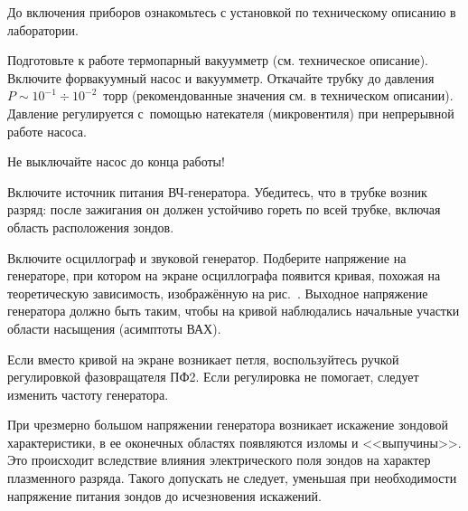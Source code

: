 \begin{lab:task}



\item До включения приборов ознакомьтесь с установкой по техническому описанию 
в лаборатории.

\item Подготовьте к работе термопарный вакуумметр (см. техническое описание). 
Включите форвакуумный насос и вакуумметр. 
Откачайте трубку до давления $P\sim 10^{-1}\div 10^{-2}$~торр (рекомендованные
значения см. в техническом описании). Давление
регулируется с~помощью натекателя (микровентиля) при непрерывной работе
насоса.

\begin{lab:warning}
    Не выключайте насос до конца работы!
\end{lab:warning}

\item Включите источник питания ВЧ-генератора. Убедитесь, что
в трубке возник разряд: после зажигания он должен устойчиво гореть 
по всей трубке, включая область расположения зондов.

\item  Включите осциллограф и звуковой генератор. 
Подберите напряжение на генераторе, при котором на экране осциллографа 
появится кривая, похожая на теоретическую зависимость, изображённую на
рис.~.
Выходное напряжение генератора должно быть таким, чтобы на кривой 
наблюдались начальные участки области насыщения (асимптоты ВАХ).

Если вместо кривой на экране возникает петля, воспользуйтесь ручкой 
регулировкой фазовращателя ПФ2. Если регулировка не помогает, следует 
изменить частоту генератора.

При чрезмерно большом напряжении генератора
возникает искажение зондовой характеристики, в ее оконечных областях появляются
изломы и <<выпучины>>. Это происходит вследствие влияния электрического поля зондов
на характер плазменного разряда. Такого допускать не следует, уменьшая
при необходимости напряжение питания зондов до исчезновения искажений.



\end{lab:task}
